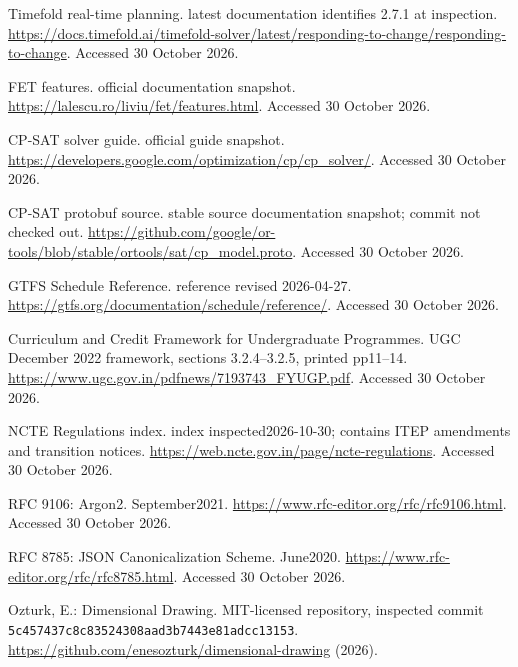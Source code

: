  Timefold real-time planning. latest documentation identifies 2.7.1 at inspection. \url{https://docs.timefold.ai/timefold-solver/latest/responding-to-change/responding-to-change}. Accessed 30 October 2026.

 FET features. official documentation snapshot. \url{https://lalescu.ro/liviu/fet/features.html}. Accessed 30 October 2026.

 CP-SAT solver guide. official guide snapshot. \url{https://developers.google.com/optimization/cp/cp_solver/}. Accessed 30 October 2026.

 CP-SAT protobuf source. stable source documentation snapshot; commit not checked out. \url{https://github.com/google/or-tools/blob/stable/ortools/sat/cp_model.proto}. Accessed 30 October 2026.

 GTFS Schedule Reference. reference revised 2026-04-27. \url{https://gtfs.org/documentation/schedule/reference/}. Accessed 30 October 2026.

 Curriculum and Credit Framework for Undergraduate Programmes. UGC December 2022 framework, sections 3.2.4--3.2.5, printed pp11--14. \url{https://www.ugc.gov.in/pdfnews/7193743_FYUGP.pdf}. Accessed 30 October 2026.

 NCTE Regulations index. index inspected2026-10-30; contains ITEP amendments and transition notices. \url{https://web.ncte.gov.in/page/ncte-regulations}. Accessed 30 October 2026.

 RFC 9106: Argon2. September2021. \url{https://www.rfc-editor.org/rfc/rfc9106.html}. Accessed 30 October 2026.

 RFC 8785: JSON Canonicalization Scheme. June2020. \url{https://www.rfc-editor.org/rfc/rfc8785.html}. Accessed 30 October 2026.

 Ozturk, E.: Dimensional Drawing. MIT-licensed repository, inspected commit \texttt{5c457437c8c83524308aad3b7443e81adcc13153}. \url{https://github.com/enesozturk/dimensional-drawing} (2026).
